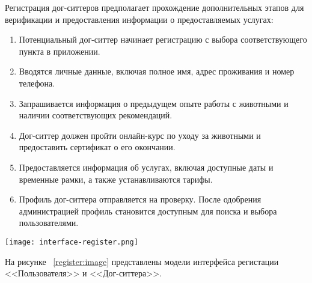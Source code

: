 Регистрация дог-ситтеров предполагает прохождение дополнительных этапов для верификации и предоставления информации о предоставляемых услугах:
\begin{enumerate}
    \item Потенциальный дог-ситтер начинает регистрацию с выбора соответствующего пункта в приложении.
    \item Вводятся личные данные, включая полное имя, адрес проживания и номер телефона.
    \item Запрашивается информация о предыдущем опыте работы с животными и наличии соответствующих рекомендаций.
    \item Дог-ситтер должен пройти онлайн-курс по уходу за животными и предоставить сертификат о его окончании.
    \item Предоставляется информация об услугах, включая доступные даты и временные рамки, а также устанавливаются тарифы.
    \item Профиль дог-ситтера отправляется на проверку. После одобрения администрацией профиль становится доступным для поиска и выбора пользователями.
\end{enumerate}

\begin{плакат}
    \texttt{[image: interface-register.png]}
    \label{register:image}
\end{плакат}

На рисунке ~\ref{register:image} представлены модели интерфейса регистации <<Пользователя>> и <<Дог-ситтера>>.



